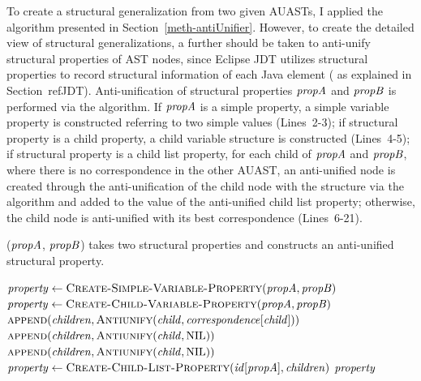 
To create a structural generalization from two given AUASTs, I applied the  algorithm presented in Section~\ref{meth-antiUnifier}. However, to create the detailed view of structural generalizations, a further should be taken to anti-unify structural properties of AST nodes, since Eclipse JDT utilizes structural properties to record structural information of each Java element ( as explained in Section~ref{JDT}). Anti-unification of structural properties $\mathit{propA}$ and $\mathit{propB}$ is performed via the  algorithm. If $\mathit{propA}$ is a simple property, a simple variable property is constructed referring to two simple values (Lines~2-3); if structural property is a child property, a child variable structure is constructed (Lines~4-5); if structural property is a child list property, for each child of $\mathit{propA}$ and $\mathit{propB}$, where there is no correspondence in the other AUAST, an anti-unified node is created through the anti-unification of the child node with the \NIL{} structure via the  algorithm and added to the value of the anti-unified child list property; otherwise, the child node is anti-unified with its best correspondence (Lines~6-21).


\begin{algorithm}
 \caption{($\mathit{propA}$, $\mathit{propB}$) takes two structural properties and constructs an anti-unified structural property.}
  \label{AntiUnify}
  \begin{algorithmic}[1]
\AntiUnifyProperty
{}

	      \State $\mathit{property} \gets  \textsc{Create-Simple-Variable-Property}(\mathit{propA},\mathit{propB})$
			\State $\mathit{property} \gets  \textsc{Create-Child-Variable-Property}(\mathit{propA},\mathit{propB})$
	  \State $\textsc{append}(\mathit{children},\textsc{Antiunify}(\mathit{child}, \mathit{correspondence}[\mathit{child}]))$
	   \Else 	
	    \State $\textsc{append}(\mathit{children},\textsc{Antiunify}(\mathit{child}, \textrm{NIL}))$
	    \EndIf
      \EndFor
	    \State $\textsc{append}(\mathit{children},\textsc{Antiunify}(\mathit{child}, \textrm{NIL}))$
	    \EndIf
      \EndFor
		\State $\mathit{property} \gets  \textsc{Create-Child-List-Property}(\mathit{id[propA]},\mathit{children})$
    \EndIf
\Return $\mathit{property}$
\end{algorithmic}
\end{algorithm}



